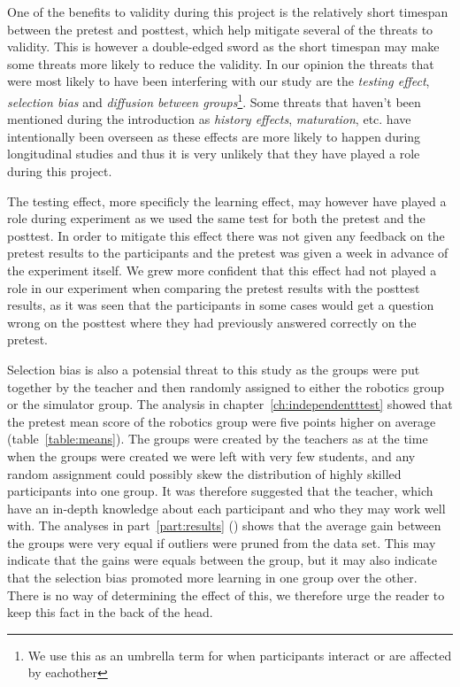 	\bigskip\noindent
	One of the benefits to validity during this project is the relatively short timespan between the pretest and posttest, which help mitigate several of the threats to validity. This is however a double-edged sword as the short timespan may make some threats more likely to reduce the validity. In our opinion the threats that were most likely to have been interfering with our study are the \textit{testing effect}, \textit{selection bias} and \textit{diffusion between groups}\footnote{We use this as an umbrella term for when participants interact or are affected by eachother}. 
	Some threats that haven't been mentioned during the introduction as \textit{history effects}, \textit{maturation}, etc. have intentionally been overseen as these effects are more likely to happen during longitudinal studies and thus it is very unlikely that they have played a role during this project. 
	
	\bigskip\noindent
	The testing effect, more specificly the learning effect, may however have played a role during experiment as we used the same test for both the pretest and the posttest. In order to mitigate this effect there was not given any feedback on the pretest results to the participants and the pretest was given a week in advance of the experiment itself. We grew more confident that this effect had not played a role in our experiment when comparing the pretest results with the posttest results, as it was seen that the participants in some cases would get a question wrong on the posttest where they had previously answered correctly on the pretest. 
	
	\bigskip\noindent
	Selection bias is also a potensial threat to this study as the groups were put together by the teacher and then randomly assigned to either the robotics group or the simulator group. The analysis in chapter~\ref{ch:independentttest} showed that the pretest mean score of the robotics group were five points higher on average (table~\ref{table:means}). The groups were created by the teachers as at the time when the groups were created we were left with very few students, and any random assignment could possibly skew the distribution of highly skilled participants into one group. It was therefore suggested that the teacher, which have an in-depth knowledge about each participant and who they may work well with. The analyses in part~\ref{part:results} () shows that the average gain between the groups were very equal if outliers were pruned from the data set. This may indicate that the gains were equals between the group, but it may also indicate that the selection bias promoted more learning in one group over the other. There is no way of determining the effect of this, we therefore urge the reader to keep this fact in the back of the head. 
	
